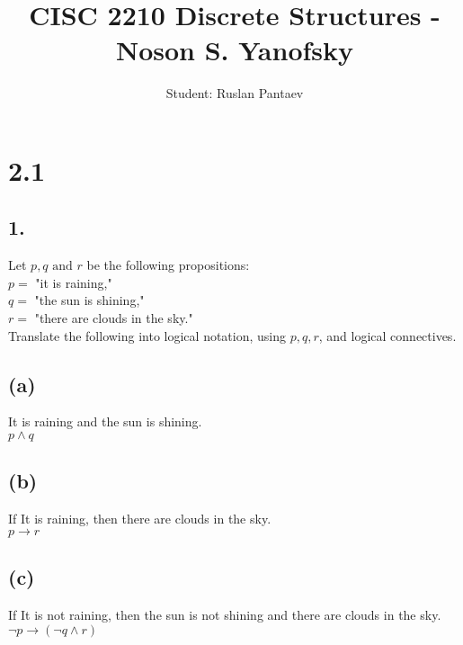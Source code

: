 \documentclass[11pt]{article}
\begin{document}
\title{CISC 2210 Discrete Structures - Noson S. Yanofsky}
\author{Student: Ruslan Pantaev}
\maketitle


\section*{2.1}
%
%
\subsection*{1.}
\begin{center}
Let $p,q \text{ and } r$ be the following propositions:\\
$p =$ "it is raining,"\\
$q =$ "the sun is shining,"\\
$r =$ "there are clouds in the sky."\\
\hfill \break
Translate the following into logical notation, using $p,q,r$, and logical connectives.
\end{center}

\subsection*{(a)}
\begin{center}
It is raining and the sun is shining.\\
\hfill \break
$p \wedge q$
\end{center}

\subsection*{(b)}
\begin{center}
If It is raining, then there are clouds in the sky.\\
\hfill \break
$p \rightarrow r$
\end{center}

\subsection*{(c)}
\begin{center}
If It is not raining, then the sun is not shining and there are clouds in the sky.\\
\hfill \break
$\neg p \rightarrow (\neg q \wedge r)$
\end{center}
\end{document}

